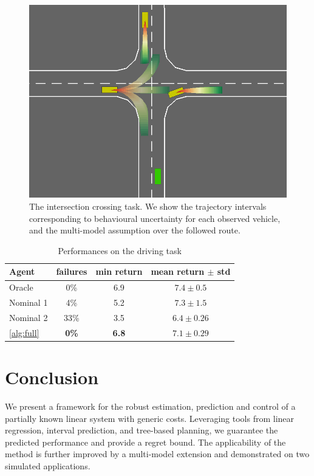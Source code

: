 \begin{figure}[t]
	\centering
	\includegraphics[width=0.7\linewidth]{img/highway-small}
	\caption{The intersection crossing task. We show the trajectory intervals corresponding to behavioural uncertainty for each observed vehicle, and the multi-model assumption over the followed route.}
\end{figure}

\begin{table}[t]
	\caption{Performances on the driving task}
	\label{tab:driving}
	\centering
	\begin{tabular}{lccc}
		\toprule
		Agent &
		failures &
		min return &
		mean return $\pm$ std  \\
		\midrule
		Oracle & 0\% & {6.9} & $7.4 \pm 0.5$ \\
		\midrule
		{Nominal 1} & 4\% & {5.2} & $\mathbf{7.3} \pm 1.5$ \\
		{Nominal 2} & 33\% & {3.5} & $6.4 \pm 0.26$ \\
		\autoref{alg:full} & \textbf{0\%} & \textbf{6.8} & $7.1 \pm 0.29$ \\
		\bottomrule
	\end{tabular}
\end{table}

\section*{Conclusion}

We present a framework for the robust estimation, prediction and control of a partially known linear system with generic costs. Leveraging tools from linear regression, interval prediction, and tree-based planning, we guarantee the predicted performance and provide a regret bound. The applicability of the method is further improved by a multi-model extension and demonstrated on two simulated applications.

